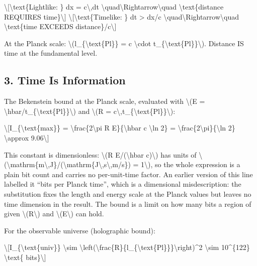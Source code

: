 \documentclass[
  10pt,
]{article}
\begin{document}
\textbackslash{[}\textbackslash text\{Lightlike: \} dx =
c\textbackslash,dt
\textbackslash quad\textbackslash Rightarrow\textbackslash quad
\textbackslash text\{distance REQUIRES time\}\textbackslash{]}
\textbackslash{[}\textbackslash text\{Timelike: \} dt \textgreater{}
dx/c \textbackslash quad\textbackslash Rightarrow\textbackslash quad
\textbackslash text\{time EXCEEDS distance\}/c\textbackslash{]}

At the Planck scale: \textbackslash(l\_\{\textbackslash text\{Pl\}\} = c
\textbackslash cdot t\_\{\textbackslash text\{Pl\}\}\textbackslash).
Distance IS time at the fundamental level.

\hypertarget{time-is-information}{%
\subsection{3. Time Is Information}\label{time-is-information}}

The Bekenstein bound at the Planck scale, evaluated with
\textbackslash(E =
\textbackslash hbar/t\_\{\textbackslash text\{Pl\}\}\textbackslash) and
\textbackslash(R =
c\textbackslash,t\_\{\textbackslash text\{Pl\}\}\textbackslash):

\textbackslash{[}I\_\{\textbackslash text\{max\}\} =
\textbackslash frac\{2\textbackslash pi R E\}\{\textbackslash hbar c
\textbackslash ln 2\} =
\textbackslash frac\{2\textbackslash pi\}\{\textbackslash ln 2\}
\textbackslash approx 9.06\textbackslash{]}

This constant is dimensionless: \textbackslash(R E/(\textbackslash hbar
c)\textbackslash) has units of
\textbackslash(\textbackslash mathrm\{m\textbackslash,J\}/(\textbackslash mathrm\{J\textbackslash,s\textbackslash,m/s\})
= 1\textbackslash), so the whole expression is a plain bit count and
carries no per-unit-time factor. An earlier version of this line
labelled it ``bits per Planck time'', which is a dimensional
misdescription: the substitution fixes the length and energy scale at
the Planck values but leaves no time dimension in the result. The bound
is a limit on how many bits a region of given
\textbackslash(R\textbackslash) and \textbackslash(E\textbackslash) can
hold.

For the observable universe (holographic bound):

\textbackslash{[}I\_\{\textbackslash text\{univ\}\} \textbackslash sim
\textbackslash left(\textbackslash frac\{R\}\{l\_\{\textbackslash text\{Pl\}\}\}\textbackslash right)\^{}2
\textbackslash sim 10\^{}\{122\} \textbackslash text\{
bits\}\textbackslash{]}
\end{document}
